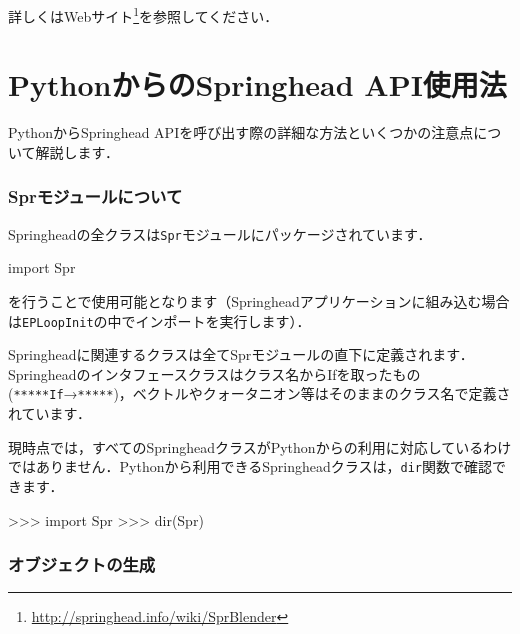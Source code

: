 \KLUDGE 詳しくはWebサイト\footnote{\url{http://springhead.info/wiki/SprBlender}}を参照してください．



\KLUDGE %
\KLUDGE %
\KLUDGE %
\KLUDGE %
\section{PythonからのSpringhead API使用法}
\label{sec_pythonsprAPI}

\KLUDGE %
\KLUDGE %

PythonからSpringhead APIを呼び出す際の詳細な方法といくつかの注意点について解説します．

\KLUDGE %
\KLUDGE %
\subsubsection*{Sprモジュールについて}

Springheadの全クラスは\texttt{Spr}モジュールにパッケージされています．
\begin{sourcecode}
import Spr
\end{sourcecode}
\KLUDGE を行うことで使用可能となります（Springheadアプリケーションに組み込む場合は\texttt{EPLoopInit}の中でインポートを実行します）．

Springheadに関連するクラスは全てSprモジュールの直下に定義されます．Springheadのインタフェースクラスはクラス名からIfを取ったもの(\texttt{*****If}→\texttt{*****})，ベクトルやクォータニオン等はそのままのクラス名で定義されています．

\KLUDGE 現時点では，すべてのSpringheadクラスがPythonからの利用に対応しているわけではありません．Pythonから利用できるSpringheadクラスは，\texttt{dir}関数で確認できます．
\begin{sourcecode}
\KLUDGE >>> import Spr
\KLUDGE >>> dir(Spr)
\end{sourcecode}


\KLUDGE %
\KLUDGE %
\subsubsection*{オブジェクトの生成}

